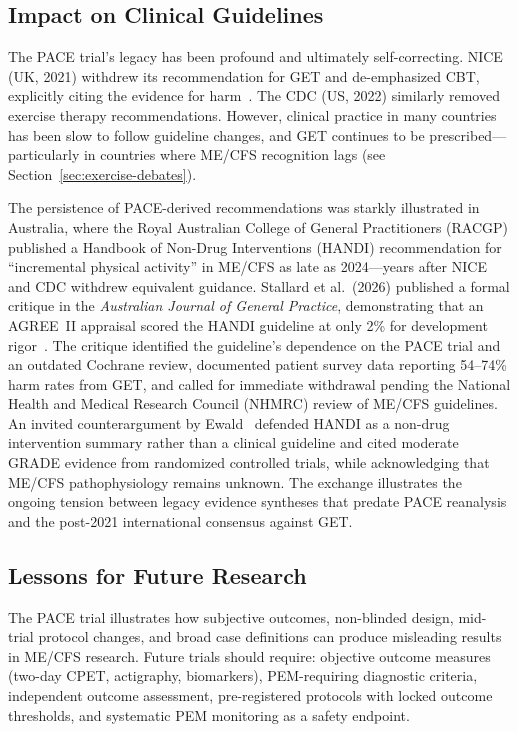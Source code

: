 \subsection{Impact on Clinical Guidelines}

The PACE trial's legacy has been profound and ultimately self-correcting. NICE (UK, 2021) withdrew its recommendation for GET and de-emphasized CBT, explicitly citing the evidence for harm~\cite{NICE2021mecfs}. The CDC (US, 2022) similarly removed exercise therapy recommendations. However, clinical practice in many countries has been slow to follow guideline changes, and GET continues to be prescribed---particularly in countries where ME/CFS recognition lags (see Section~\ref{sec:exercise-debates}).

The persistence of PACE-derived recommendations was starkly illustrated in Australia, where the Royal Australian College of General Practitioners (RACGP) published a Handbook of Non-Drug Interventions (HANDI) recommendation for ``incremental physical activity'' in ME/CFS as late as 2024---years after NICE and CDC withdrew equivalent guidance. Stallard et al.\ (2026) published a formal critique in the \textit{Australian Journal of General Practice}, demonstrating that an AGREE~II appraisal scored the HANDI guideline at only 2\% for development rigor~\cite{Stallard2026handi}. The critique identified the guideline's dependence on the PACE trial and an outdated Cochrane review, documented patient survey data reporting 54--74\% harm rates from GET, and called for immediate withdrawal pending the National Health and Medical Research Council (NHMRC) review of ME/CFS guidelines. An invited counterargument by Ewald~\cite{Ewald2026handiresponse} defended HANDI as a non-drug intervention summary rather than a clinical guideline and cited moderate GRADE evidence from randomized controlled trials, while acknowledging that ME/CFS pathophysiology remains unknown. The exchange illustrates the ongoing tension between legacy evidence syntheses that predate PACE reanalysis and the post-2021 international consensus against GET.

\subsection{Lessons for Future Research}

The PACE trial illustrates how subjective outcomes, non-blinded design, mid-trial protocol changes, and broad case definitions can produce misleading results in ME/CFS research. Future trials should require: objective outcome measures (two-day CPET, actigraphy, biomarkers), PEM-requiring diagnostic criteria, independent outcome assessment, pre-registered protocols with locked outcome thresholds, and systematic PEM monitoring as a safety endpoint.


